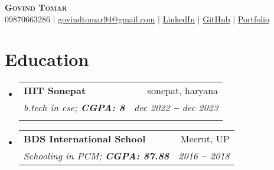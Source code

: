 \documentclass[letterpaper,11pt]{article}
\makeatletter
\newcommand{\resumeItem}[1]{
\item\small{
{#1 \vspace{-2pt}}
  }
}
\newcommand{\resumeSubheading}[4]{
  \vspace{-2pt}\item
    \begin{tabular*}{0.97\textwidth}[t]{l@{\extracolsep{\fill}}r}
      \textbf{#1} & #2 \\
      \textit{\small#3} & \textit{\small #4} \\
    \end{tabular*}\vspace{-7pt}
}
\newcommand{\resumeEducationHeading}[6]{
  \vspace{-2pt}\item
    \begin{tabular*}{0.97\textwidth}[t]{l@{\extracolsep{\fill}}r}
      \textbf{#1} & #2 \\
      \textit{\small#3} & \textit{\small #4} \\
      \textit{\small#5} & \textit{\small #6} \\
    \end{tabular*}\vspace{-5pt}
}
\newcommand{\resumeSubHeadingListStart}{\begin{itemize}[leftmargin=0.15in, label={}]}
\newcommand{\resumeSubHeadingListEnd}{\end{itemize}}
\newcommand{\resumeItemListStart}{\begin{itemize}}
\newcommand{\resumeItemListEnd}{\end{itemize}\vspace{-5pt}}
\makeatother
\begin{document}

\begin{center}
    \textbf{\Huge \scshape Govind Tomar} \\ \vspace{3pt}
    \small
    \faMobile \hspace{.5pt} {09870663286}
    $|$
    \faAt \hspace{.5pt} \href{mailto:govindtomar94@gmail.com}{govindtomar94@gmail.com}
    $|$
    \faLinkedinSquare \hspace{.5pt} \href{linkedin.com/govindtomar}{LinkedIn}
    $|$
    \faGithub \hspace{.5pt} \href{github.com/govindtomar}{GitHub}
    $|$
    \faGlobe \hspace{.5pt} \href{govindtomar.io}{Portfolio}
\end{center}




\section{Education}
  \vspace{3pt}
  \resumeSubHeadingListStart
  
\resumeEducationHeading
{IIIT Sonepat
}{sonepat, haryana}
{b.tech in cse;   \textbf{CGPA: 8}}{dec 2022 \textbf{--} dec 2023}
{}{}

\resumeSubheading
{BDS International School
}{Meerut, UP}
{Schooling in PCM;   \textbf{CGPA: 87.88}}{2016 \textbf{--} 2018}

  \resumeSubHeadingListEnd




  

\end{document}
